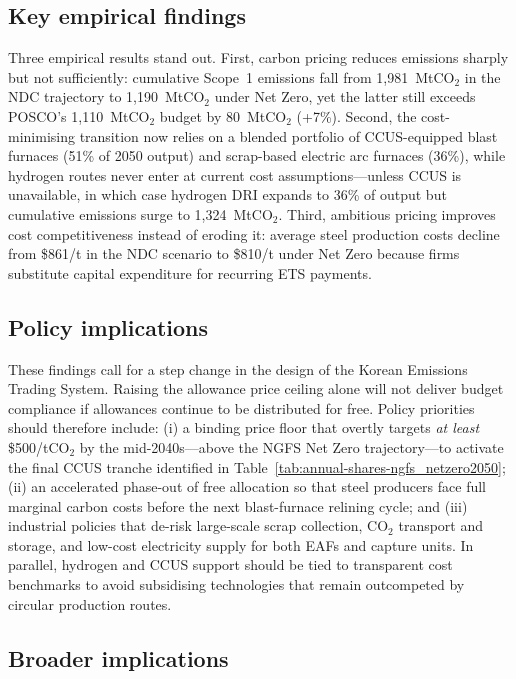 \documentclass[preprint,1p,authoryear]{elsarticle}
\begin{document}
\subsection{Key empirical findings}

Three empirical results stand out. First, carbon pricing reduces emissions sharply but not sufficiently: cumulative Scope~1 emissions fall from 1{,}981~MtCO$_2$ in the NDC trajectory to 1{,}190~MtCO$_2$ under Net Zero, yet the latter still exceeds POSCO's 1{,}110~MtCO$_2$ budget by 80~MtCO$_2$ (+7\%). Second, the cost-minimising transition now relies on a blended portfolio of CCUS-equipped blast furnaces (51\% of 2050 output) and scrap-based electric arc furnaces (36\%), while hydrogen routes never enter at current cost assumptions—unless CCUS is unavailable, in which case hydrogen DRI expands to 36\% of output but cumulative emissions surge to 1{,}324~MtCO$_2$. Third, ambitious pricing improves cost competitiveness instead of eroding it: average steel production costs decline from \$861/t in the NDC scenario to \$810/t under Net Zero because firms substitute capital expenditure for recurring ETS payments.

\subsection{Policy implications}

These findings call for a step change in the design of the Korean Emissions Trading System. Raising the allowance price ceiling alone will not deliver budget compliance if allowances continue to be distributed for free. Policy priorities should therefore include: (i) a binding price floor that overtly targets \emph{at least} \$500/tCO$_2$ by the mid-2040s—above the NGFS Net Zero trajectory—to activate the final CCUS tranche identified in Table~\ref{tab:annual-shares-ngfs_netzero2050}; (ii) an accelerated phase-out of free allocation so that steel producers face full marginal carbon costs before the next blast-furnace relining cycle; and (iii) industrial policies that de-risk large-scale scrap collection, CO$_2$ transport and storage, and low-cost electricity supply for both EAFs and capture units. In parallel, hydrogen and CCUS support should be tied to transparent cost benchmarks to avoid subsidising technologies that remain outcompeted by circular production routes.

\subsection{Broader implications}
\end{document}
